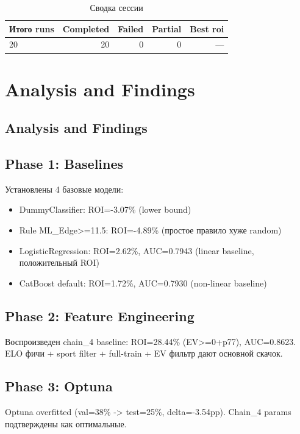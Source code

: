 \documentclass[12pt,a4paper]{article}
\begin{document}
\begin{table}[H]
\centering
\caption{Сводка сессии}
\begin{tabular}{lrrrr}
\toprule
Итого runs & Completed & Failed & Partial & Best roi \\
\midrule
20 & \textcolor{passcolor}{20}
    & \textcolor{failcolor}{0}
    & \textcolor{partialcolor}{0}
    & --- \\
\bottomrule
\end{tabular}
\end{table}







\section{Analysis and Findings}

\subsection{Analysis and Findings}

\subsection{Phase 1: Baselines}
Установлены 4 базовые модели:
\begin{itemize}
  \item DummyClassifier: ROI=-3.07\% (lower bound)
  \item Rule ML\_Edge>=11.5: ROI=-4.89\% (простое правило хуже random)
  \item LogisticRegression: ROI=2.62\%, AUC=0.7943 (linear baseline, положительный ROI)
  \item CatBoost default: ROI=1.72\%, AUC=0.7930 (non-linear baseline)
\end{itemize}

\subsection{Phase 2: Feature Engineering}
Воспроизведен chain\_4 baseline: ROI=28.44\% (EV>=0+p77), AUC=0.8623.
ELO фичи + sport filter + full-train + EV фильтр дают основной скачок.

\subsection{Phase 3: Optuna}
Optuna overfitted (val=38\% -> test=25\%, delta=-3.54pp). Chain\_4 params подтверждены как оптимальные.
\end{document}
